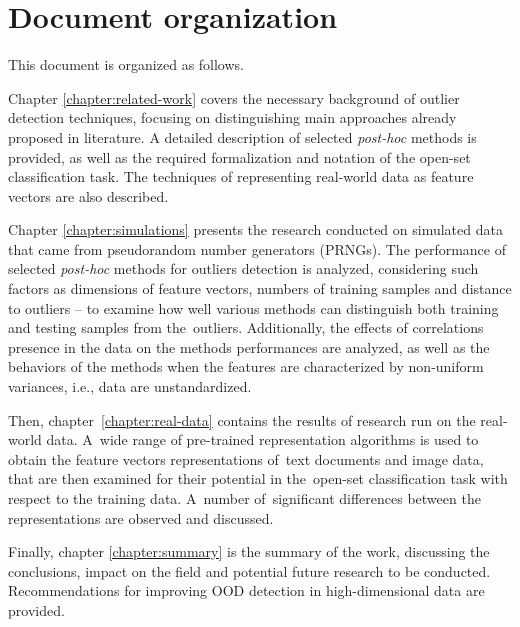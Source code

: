 \clearpage{}


\section{Document organization}
\label{section:document-organisation}

This document is organized as follows.

Chapter \ref{chapter:related-work} covers the necessary background of outlier detection techniques, focusing on distinguishing main approaches already proposed in literature. A detailed description of selected \textit{post-hoc} methods is provided, as well as the required formalization and notation of the open-set classification task. The techniques of representing real-world data as feature vectors are also described.

Chapter \ref{chapter:simulations} presents the research conducted on simulated data that came from pseudorandom number generators (PRNGs). The performance of selected \textit{post-hoc} methods for outliers detection is analyzed, considering such factors as dimensions of feature vectors, numbers of training samples and distance to outliers – to examine how well various methods can distinguish both training and testing samples from the~outliers. Additionally, the effects of correlations presence in the data on the methods performances are analyzed, as well as the behaviors of the methods when the features are characterized by non-uniform variances, i.e., data are unstandardized.

Then, chapter~\ref{chapter:real-data} contains the results of research run on the real-world data. A~wide range of pre-trained representation algorithms is used to obtain the feature vectors representations of~text documents and image data, that are then examined for their potential in the~open-set classification task with respect to the training data. A~number of~significant differences between the representations are observed and discussed.

Finally, chapter \ref{chapter:summary} is the summary of the work, discussing the conclusions, impact on the field and potential future research to be conducted. Recommendations for improving OOD detection in high-dimensional data are provided.
